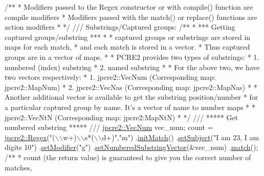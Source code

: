 \begin{DoxyCode}
\textcolor{comment}{}
\textcolor{comment}{/**}
\textcolor{comment}{ * Modifiers passed to the Regex constructor or with compile() function are compile modifiers}
\textcolor{comment}{ * Modifiers passed with the match() or replace() functions are action modifiers}
\textcolor{comment}{ * */}
\textcolor{comment}{}
\textcolor{comment}{/// Substrings/Captured groups:}
\textcolor{comment}{}\textcolor{comment}{}
\textcolor{comment}{/**}
\textcolor{comment}{ * *** Getting captured groups/substring ***}
\textcolor{comment}{ * }
\textcolor{comment}{ * captured groups or substrings are stored in maps for each match,}
\textcolor{comment}{ * and each match is stored in a vector. }
\textcolor{comment}{ * Thus captured groups are in a vector of maps.}
\textcolor{comment}{ * }
\textcolor{comment}{ * PCRE2 provides two types of substrings:}
\textcolor{comment}{ *  1. numbered (index) substring}
\textcolor{comment}{ *  2. named substring}
\textcolor{comment}{ * }
\textcolor{comment}{ * For the above two, we have two vectors respectively:}
\textcolor{comment}{ *  1. jpcre2::VecNum (Corresponding map: jpcre2::MapNum)}
\textcolor{comment}{ *  2. jpcre2::VecNas (Corresponding map: jpcre2::MapNas)}
\textcolor{comment}{ * }
\textcolor{comment}{ * Another additional vector is available to get the substring position/number}
\textcolor{comment}{ * for a particular captured group by name. It's a vector of name to number maps}
\textcolor{comment}{ *  * jpcre2::VecNtN (Corresponding map: jpcre2:MapNtN)}
\textcolor{comment}{ * */}
\textcolor{comment}{}
\textcolor{comment}{/// ***** Get numbered substring ***** ///}
\textcolor{comment}{}\hyperlink{namespacejpcre2_ac1cf752c8fbb0be78020be3b80e77ce3}{jpcre2::VecNum} vec\_num;
count = 
\hyperlink{classjpcre2_1_1Regex}{jpcre2::Regex}(\textcolor{stringliteral}{"(\(\backslash\)\(\backslash\)w+)\(\backslash\)\(\backslash\)s*(\(\backslash\)\(\backslash\)d+)"},\textcolor{stringliteral}{"m"})
        .\hyperlink{classjpcre2_1_1Regex_a519b0915bf1163c6ce6a4d674b30cfcd}{initMatch}()
        .\hyperlink{classjpcre2_1_1RegexMatch_a635c652195deaa8ebb9e107c4f972aab}{setSubject}(\textcolor{stringliteral}{"I am 23, I am digits 10"})
        .\hyperlink{classjpcre2_1_1RegexMatch_a9df7e92f96b61553f62720cb8f5f23e5}{setModifier}(\textcolor{stringliteral}{"g"})
        .\hyperlink{classjpcre2_1_1RegexMatch_a2c7efe1ec2e13827f670db4ecedcd0a0}{setNumberedSubstringVector}(&vec\_num)
        .\hyperlink{classjpcre2_1_1RegexMatch_a5868aef3a146594ea1ebef34d122bb33}{match}();\textcolor{comment}{}
\textcolor{comment}{/**}
\textcolor{comment}{* count (the return value) is guaranteed to give you the correct number of matches,}

\end{DoxyCode}
